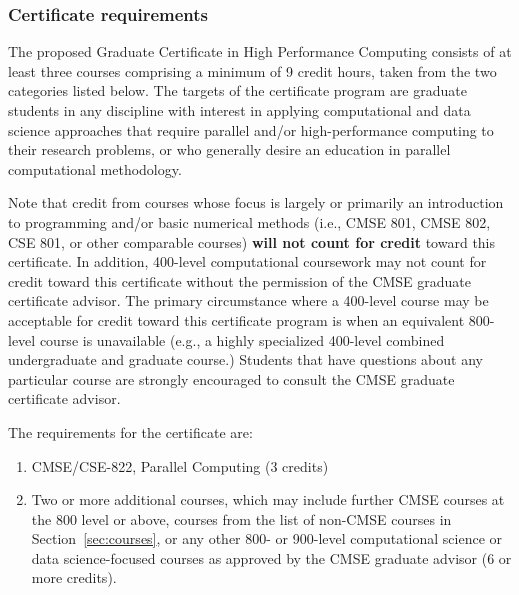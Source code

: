 \subsubsection{Certificate requirements}

The proposed Graduate Certificate in High Performance Computing
consists of at least three courses comprising a minimum of 9 credit
hours, taken from the two categories listed below. The targets of the
certificate program are graduate students in any discipline with
interest in applying computational and data science approaches that
require parallel and/or high-performance computing to their research
problems, or who generally desire an education in parallel
computational methodology.

Note that credit from courses whose focus is largely or primarily an
introduction to programming and/or basic numerical methods (i.e., CMSE
801, CMSE 802, CSE 801, or other comparable courses) \textbf{will not count
for credit} toward this certificate. In addition, 400-level
computational coursework may not count for credit toward this
certificate without the permission of the CMSE graduate certificate
advisor. The primary circumstance where a 400-level course may be
acceptable for credit toward this certificate program is when an
equivalent 800-level course is unavailable (e.g., a highly specialized
400-level combined undergraduate and graduate course.) Students that
have questions about any particular course are strongly encouraged to
consult the CMSE graduate certificate advisor.

\vspace{2mm}
\noindent
The requirements for the certificate are:

\begin{enumerate}

\item CMSE/CSE-822, Parallel Computing (3 credits)  

\item Two or more additional courses, which may include further CMSE
  courses at the 800 level or above, courses from the list of non-CMSE
  courses in Section~\ref{sec:courses}, or any other 800-
  or 900-level computational science or data science-focused courses
  as approved by the CMSE graduate advisor (6 or more credits).

\end{enumerate}

